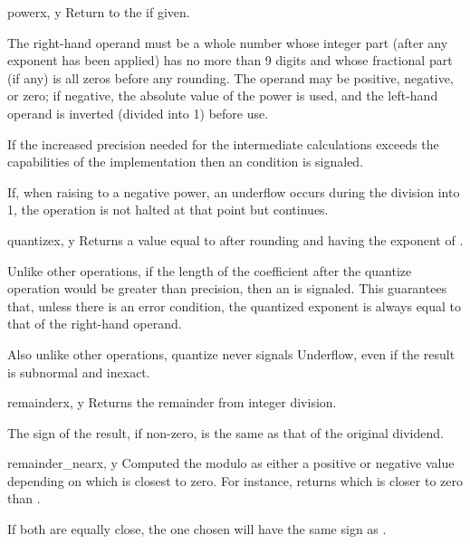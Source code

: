 \begin{methoddesc}{power}{x, y}
  Return  to the  if given.

  The right-hand operand must be a whole number whose integer part (after any
  exponent has been applied) has no more than 9 digits and whose fractional
  part (if any) is all zeros before any rounding. The operand may be positive,
  negative, or zero; if negative, the absolute value of the power is used, and
  the left-hand operand is inverted (divided into 1) before use.

  If the increased precision needed for the intermediate calculations exceeds
  the capabilities of the implementation then an 
  condition is signaled.

  If, when raising to a negative power, an underflow occurs during the
  division into 1, the operation is not halted at that point but continues. 
\end{methoddesc}

\begin{methoddesc}{quantize}{x, y}
  Returns a value equal to  after rounding and having the exponent of
  .

  Unlike other operations, if the length of the coefficient after the quantize
  operation would be greater than precision, then an
   is signaled. This guarantees that, unless there
  is an error condition, the quantized exponent is always equal to that of the
  right-hand operand.

  Also unlike other operations, quantize never signals Underflow, even
  if the result is subnormal and inexact.  
\end{methoddesc} 

\begin{methoddesc}{remainder}{x, y}
  Returns the remainder from integer division.

  The sign of the result, if non-zero, is the same as that of the original
  dividend. 
\end{methoddesc}
 
\begin{methoddesc}{remainder_near}{x, y}
  Computed the modulo as either a positive or negative value depending
  on which is closest to zero.  For instance,
   returns 
  which is closer to zero than .

  If both are equally close, the one chosen will have the same sign
  as .
\end{methoddesc}

